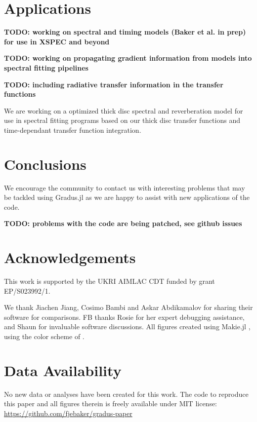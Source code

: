 \documentclass[fleqn,usenatbib]{mnras}
\newcommand{\todo}[1]{{\noindent \bf \color{red} TODO: #1}}
\newcommand{\Gradus}{Gradus.jl }
\begin{document}
\section{Applications}

\todo{working on spectral and timing models (Baker et al. in prep) for use in XSPEC and beyond}

\todo{working on propagating gradient information from models into spectral fitting pipelines}

\todo{including radiative transfer information in the transfer functions}

We are working on a optimized thick disc spectral and reverberation model for use in spectral fitting programs based on our thick disc transfer functions and time-dependant transfer function integration.

\section{Conclusions}

We encourage the community to contact us with interesting problems that may be tackled using \Gradus as we are happy to assist with new applications of the code.

\todo{problems with the code are being patched, see github issues}


\section*{Acknowledgements}
This work is supported by the UKRI AIMLAC CDT funded by grant EP/S023992/1.

We thank Jiachen Jiang, Cosimo Bambi and Askar Abdikamalov for sharing their software for comparisons. FB thanks Rosie for her expert debugging assistance, and Shaun for invaluable software discussions. All figures created using Makie.jl \citep{DanischKrumbiegel2021}, using the color scheme of \cite{wong_points_2011}.

\section*{Data Availability}

No new data or analyses have been created for this work. The code to reproduce this paper and all figures therein is freely available under MIT license:
\url{https://github.com/fjebaker/gradus-paper}
\end{document}
